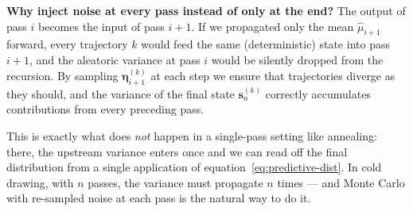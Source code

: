 \documentclass[11pt,a4paper]{article}
\begin{document}
\begin{intuitionbox}
\textbf{Why inject noise at every pass instead of only at the end?} The output of pass $i$ becomes the input of pass $i+1$. If we propagated only the mean $\hat\mu_{i+1}$ forward, every trajectory $k$ would feed the same (deterministic) state into pass $i+1$, and the aleatoric variance at pass $i$ would be silently dropped from the recursion. By sampling $\bm\eta_{i+1}^{(k)}$ at each step we ensure that trajectories diverge as they should, and the variance of the final state $\bm s_n^{(k)}$ correctly accumulates contributions from every preceding pass.

This is exactly what does \emph{not} happen in a single-pass setting like annealing: there, the upstream variance enters once and we can read off the final distribution from a single application of equation~\eqref{eq:predictive-dist}. In cold drawing, with $n$ passes, the variance must propagate $n$ times --- and Monte Carlo with re-sampled noise at each pass is the natural way to do it.
\end{intuitionbox}




\end{document}

